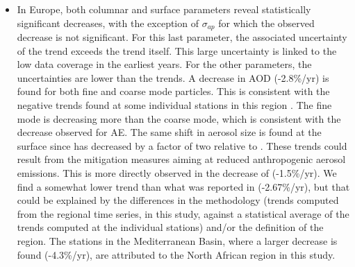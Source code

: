 \documentclass[acp, manuscript]{copernicus}
\begin{document}
\begin{itemize}
 \item In Europe, both columnar and surface parameters reveal statistically significant decreases, with the exception of $\sigma_{ap}$ for which the observed decrease is not significant. For this last parameter, the associated uncertainty of the trend exceeds the trend itself. This large uncertainty is linked to the low data coverage in the earliest years. For the other parameters, the uncertainties are lower than the trends. A decrease in AOD (-2.8\%/yr) is found for both fine and coarse mode particles. This is consistent with the negative trends found at some individual stations in this region \citep{glantz2019}. The fine mode is decreasing more than the coarse mode, which is consistent with the decrease observed for AE. The same shift in aerosol size is found at the surface since  has decreased by a factor of two relative to . These trends could result from the mitigation measures aiming at reduced anthropogenic aerosol emissions. This is more directly observed in the decrease of  (-1.5\%/yr). We find a somewhat lower trend than what was reported in \cite{aas2019global} (-2.67\%/yr), but that could be explained by the differences in the methodology (trends computed from the regional time series, in this study, against a statistical average of the trends computed at the individual stations) and/or the definition of the region. The stations in the Mediterranean Basin, where a larger decrease is found (-4.3\%/yr), are attributed to the North African region in this study.
 

\end{itemize}
\end{document}
